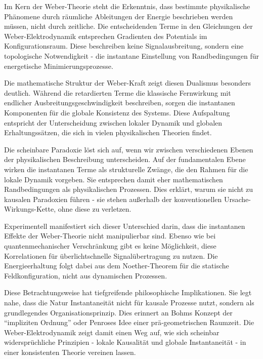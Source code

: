 Im Kern der Weber-Theorie steht die Erkenntnis, dass bestimmte physikalische Phänomene durch räumliche Ableitungen der Energie beschrieben werden müssen, nicht durch zeitliche. Die entscheidenden
Terme in den Gleichungen der Weber-Elektrodynamik entsprechen Gradienten des Potentials im Konfigurationsraum. Diese beschreiben keine Signalausbreitung, sondern eine
topologische Notwendigkeit - die instantane Einstellung von Randbedingungen für energetische Minimierungsprozesse.

Die mathematische Struktur der Weber-Kraft zeigt diesen Dualismus besonders deutlich. Während die retardierten Terme die klassische Fernwirkung mit endlicher Ausbreitungsgeschwindigkeit
beschreiben, sorgen die instantanen Komponenten für die globale Konsistenz des Systems. Diese Aufspaltung entspricht der Unterscheidung zwischen lokaler Dynamik und globalen Erhaltungssätzen,
die sich in vielen physikalischen Theorien findet.

Die scheinbare Paradoxie löst sich auf, wenn wir zwischen verschiedenen Ebenen der physikalischen Beschreibung unterscheiden. Auf der fundamentalen Ebene wirken die instantanen Terme als
strukturelle Zwänge, die den Rahmen für die lokale Dynamik vorgeben. Sie entsprechen damit eher mathematischen Randbedingungen als physikalischen Prozessen. Dies erklärt, warum sie nicht
zu kausalen Paradoxien führen - sie stehen außerhalb der konventionellen Ursache-Wirkungs-Kette, ohne diese zu verletzen.

Experimentell manifestiert sich dieser Unterschied darin, dass die instantanen Effekte der Weber-Theorie nicht manipulierbar sind. Ebenso wie bei quantenmechanischer Verschränkung gibt es
keine Möglichkeit, diese Korrelationen für überlichtschnelle Signalübertragung zu nutzen. Die Energieerhaltung folgt dabei aus dem Noether-Theorem für die statische Feldkonfiguration,
nicht aus dynamischen Prozessen.

Diese Betrachtungsweise hat tiefgreifende philosophische Implikationen. Sie legt nahe, dass die Natur Instantaneität nicht für kausale Prozesse nutzt, sondern als grundlegendes
Organisationsprinzip. Dies erinnert an Bohms Konzept der \enquote{impliziten Ordnung} oder Penroses Idee einer prä-geometrischen Raumzeit. Die Weber-Elektrodynamik zeigt damit einen Weg auf,
wie sich scheinbar widersprüchliche Prinzipien - lokale Kausalität und globale Instantaneität - in einer konsistenten Theorie vereinen lassen.

